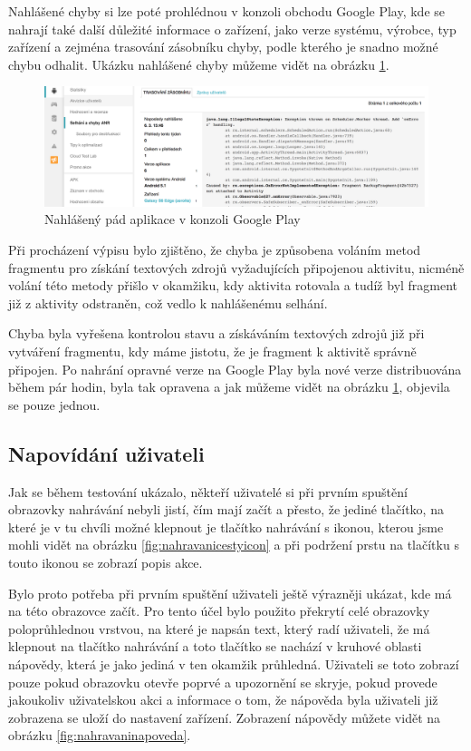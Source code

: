 \documentclass[czech,master,public,dept460,male,java,cpdeclaration]{diploma}
\begin{document}
 Nahlášené chyby si lze poté prohlédnou v konzoli obchodu Google Play, kde se nahrají také další
 důležité informace o zařízení, jako verze systému, výrobce, typ zařízení a zejména trasování zásobníku
 chyby, podle kterého je snadno možné chybu odhalit. Ukázku nahlášené chyby můžeme vidět na obrázku
 \ref{fig:anr}.

   \begin{figure}[H]
               \centering
                       \includegraphics[scale=0.7]{img/anr.png}
               \caption{Nahlášený pád aplikace v konzoli Google Play}
               \label{fig:anr}
       \end{figure}

Při procházení výpisu bylo zjištěno, že chyba je způsobena voláním metod fragmentu pro získání textových zdrojů
 vyžadujících připojenou aktivitu, nicméně volání této metody přišlo v okamžiku, kdy aktivita rotovala
a tudíž byl fragment již z aktivity odstraněn, což vedlo k nahlášenému selhání.

Chyba byla vyřešena kontrolou stavu a získáváním textových zdrojů již při vytváření fragmentu,
kdy máme jistotu, že je fragment k aktivitě správně připojen. Po nahrání opravné verze na Google Play
byla nové verze distribuována během pár hodin, byla tak opravena a jak můžeme vidět na obrázku
\ref{fig:anr}, objevila se pouze jednou.

\subsection{Napovídání uživateli}
Jak se během testování ukázalo, někteří uživatelé si při prvním spuštění obrazovky nahrávání nebyli
 jistí, čím mají začít a přesto, že jediné tlačítko, na které je v tu chvíli možné klepnout je
 tlačítko nahrávání s ikonou, kterou jsme mohli vidět na obrázku \ref{fig:nahravanicestyicon}
 a při podržení prstu na tlačítku s touto ikonou se zobrazí popis akce.

 Bylo proto potřeba při prvním spuštění uživateli ještě výrazněji ukázat, kde má na této obrazovce začít.
 Pro tento účel bylo použito překrytí celé obrazovky poloprůhlednou vrstvou, na které je napsán text, který radí
 uživateli, že má klepnout na tlačítko nahrávání a toto tlačítko se nachází v kruhové oblasti nápovědy, která je
 jako jediná v ten okamžik průhledná. Uživateli se toto zobrazí pouze pokud obrazovku otevře poprvé
 a upozornění se skryje, pokud provede jakoukoliv uživatelskou akci a informace o tom, že nápověda byla uživateli
 již zobrazena se uloží do nastavení zařízení. Zobrazení nápovědy můžete vidět na obrázku \ref{fig:nahravaninapoveda}.
\end{document}
